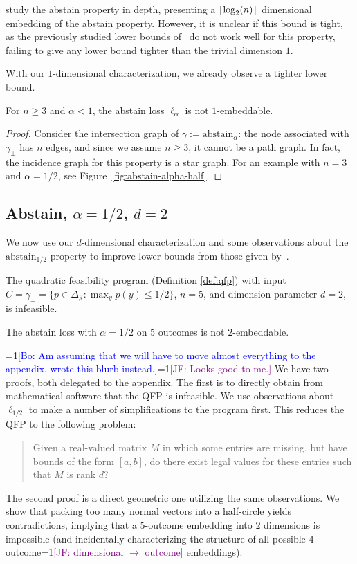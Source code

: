 \documentclass[anon]{colt2020} %
\newcommand{\Comments}{1}
\newcommand{\mynote}[2]{\ifnum\Comments=1\textcolor{#1}{#2}\fi}
\newcommand{\jessie}[1]{\mynote{purple}{[JF: #1]}}
\newcommand{\bo}[1]{\mynote{blue}{[Bo: #1]}}
\newcommand{\abstain}[1]{\mathrm{abstain}_{#1}}
\newcommand{\simplex}{\Delta_\Y}
\newcommand{\Y}{\mathcal{Y}}
\DeclarePairedDelimiter\ceil{\lceil}{\rceil}
\begin{document}
\cite{ramaswamy2018consistent} study the abstain property in depth, presenting a $\ceil {\log_2(n)}$ dimensional embedding of the abstain property.
However, it is unclear if this bound is tight, as the previously studied lower bounds of~\cite{ramaswamy2016convex} do not work well for this property, failing to give any lower bound tighter than the trivial dimension $1$.

With our $1$-dimensional characterization, we already observe a tighter lower bound.
\begin{proposition}
	For $n \geq 3$ and $\alpha < 1$, the abstain loss $\ell_{\alpha}$ is not $1$-embeddable.
\end{proposition}
\begin{proof}
	Consider the intersection graph of $\gamma := \abstain{\alpha}$: the node associated with $\gamma_\bot$ has $n$ edges, and since we assume $n \geq 3$, it cannot be a path graph.
	In fact, the incidence graph for this property is a star graph.
	For an example with $n=3$ and $\alpha = 1/2$, see Figure~\ref{fig:abstain-alpha-half}.
\end{proof}

\subsection{Abstain, $\alpha = 1/2$, $d=2$}
We now use our $d$-dimensional characterization and some observations about the $\abstain{1/2}$ property to improve lower bounds from those given by~\cite{ramaswamy2016convex}.

\begin{proposition}\label{prop:qfp-fails-abstain}
  The quadratic feasibility program (Definition \ref{def:qfp}) with input $C = \gamma_{\bot} = \{p \in \simplex: \max_y p(y) \leq 1/2\}$, $n=5$, and dimension parameter $d=2$, is infeasible.
\end{proposition}
\begin{corollary}
  The abstain loss with $\alpha=1/2$ on $5$ outcomes is not $2$-embeddable.
\end{corollary}

\bo{Am assuming that we will have to move almost everything to the appendix, wrote this blurb instead.}\jessie{Looks good to me.}
We have two proofs, both delegated to the appendix.
The first is to directly obtain from mathematical software that the QFP is infeasible.
We use observations about $\ell_{1/2}$ to make a number of simplifications to the program first.
This reduces the QFP to the following problem: 
\begin{quotation}
  Given a real-valued matrix $M$ in which some entries are missing, but have bounds of the form $[a,b]$, do there exist legal values for these entries such that $M$ is rank $d$?
\end{quotation}
The second proof is a direct geometric one utilizing the same observations.
We show that packing too many normal vectors into a half-circle yields contradictions, implying that a $5$-outcome embedding into $2$ dimensions is impossible (and incidentally characterizing the structure of all possible $4$-outcome\jessie{dimensional $\to$ outcome} embeddings).
\end{document}
